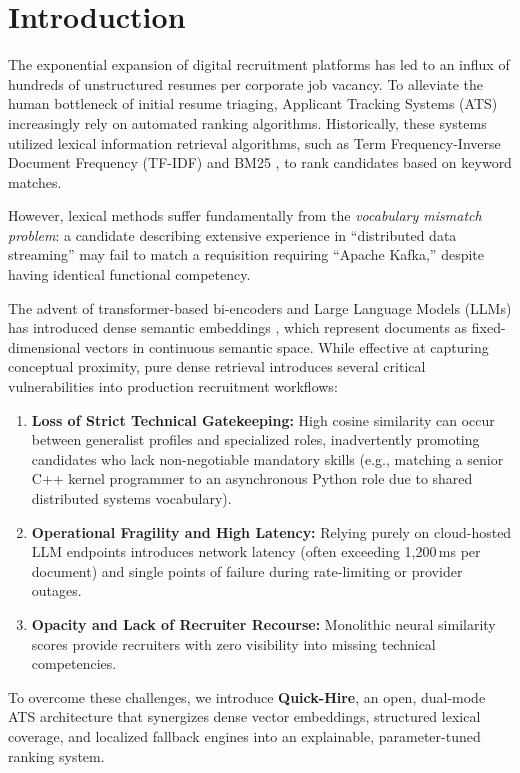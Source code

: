 \documentclass[conference]{IEEEtran}
\begin{document}
\section{Introduction}
The exponential expansion of digital recruitment platforms has led to an influx of hundreds of unstructured resumes per corporate job vacancy. To alleviate the human bottleneck of initial resume triaging, Applicant Tracking Systems (ATS) increasingly rely on automated ranking algorithms. Historically, these systems utilized lexical information retrieval algorithms, such as Term Frequency-Inverse Document Frequency (TF-IDF) and BM25 \cite{robertson2009probabilistic}, to rank candidates based on keyword matches. 

However, lexical methods suffer fundamentally from the \textit{vocabulary mismatch problem}: a candidate describing extensive experience in ``distributed data streaming'' may fail to match a requisition requiring ``Apache Kafka,'' despite having identical functional competency. 

The advent of transformer-based bi-encoders and Large Language Models (LLMs) has introduced dense semantic embeddings \cite{reimers2019sentence, geminiteam2024gemini}, which represent documents as fixed-dimensional vectors in continuous semantic space. While effective at capturing conceptual proximity, pure dense retrieval introduces several critical vulnerabilities into production recruitment workflows:
\begin{enumerate}
    \item \textbf{Loss of Strict Technical Gatekeeping:} High cosine similarity can occur between generalist profiles and specialized roles, inadvertently promoting candidates who lack non-negotiable mandatory skills (e.g., matching a senior C++ kernel programmer to an asynchronous Python role due to shared distributed systems vocabulary).
    \item \textbf{Operational Fragility and High Latency:} Relying purely on cloud-hosted LLM endpoints introduces network latency (often exceeding 1,200\,ms per document) and single points of failure during rate-limiting or provider outages.
    \item \textbf{Opacity and Lack of Recruiter Recourse:} Monolithic neural similarity scores provide recruiters with zero visibility into missing technical competencies.
\end{enumerate}

To overcome these challenges, we introduce \textbf{Quick-Hire}, an open, dual-mode ATS architecture that synergizes dense vector embeddings, structured lexical coverage, and localized fallback engines into an explainable, parameter-tuned ranking system. 
\end{document}
